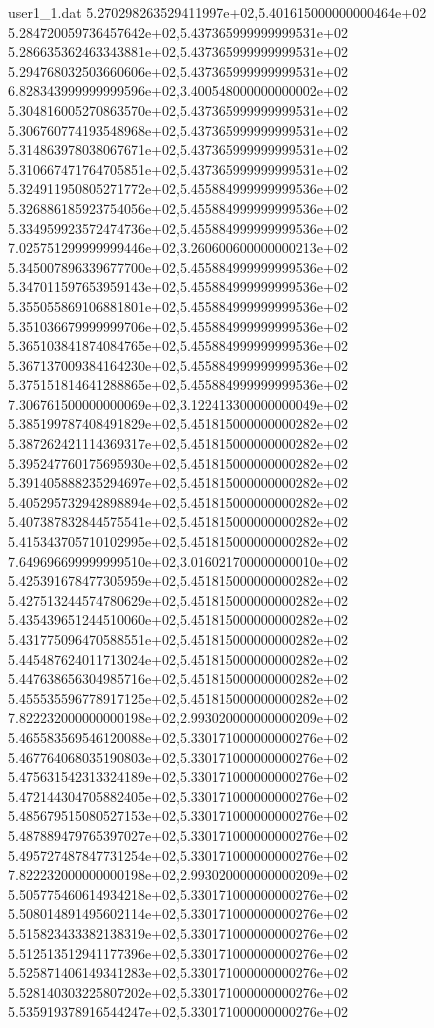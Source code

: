 \begin{filecontents}{user1_1.dat}
5.270298263529411997e+02,5.401615000000000464e+02
5.284720059736457642e+02,5.437365999999999531e+02
5.286635362463343881e+02,5.437365999999999531e+02
5.294768032503660606e+02,5.437365999999999531e+02
6.828343999999999596e+02,3.400548000000000002e+02
5.304816005270863570e+02,5.437365999999999531e+02
5.306760774193548968e+02,5.437365999999999531e+02
5.314863978038067671e+02,5.437365999999999531e+02
5.310667471764705851e+02,5.437365999999999531e+02
5.324911950805271772e+02,5.455884999999999536e+02
5.326886185923754056e+02,5.455884999999999536e+02
5.334959923572474736e+02,5.455884999999999536e+02
7.025751299999999446e+02,3.260600600000000213e+02
5.345007896339677700e+02,5.455884999999999536e+02
5.347011597653959143e+02,5.455884999999999536e+02
5.355055869106881801e+02,5.455884999999999536e+02
5.351036679999999706e+02,5.455884999999999536e+02
5.365103841874084765e+02,5.455884999999999536e+02
5.367137009384164230e+02,5.455884999999999536e+02
5.375151814641288865e+02,5.455884999999999536e+02
7.306761500000000069e+02,3.122413300000000049e+02
5.385199787408491829e+02,5.451815000000000282e+02
5.387262421114369317e+02,5.451815000000000282e+02
5.395247760175695930e+02,5.451815000000000282e+02
5.391405888235294697e+02,5.451815000000000282e+02
5.405295732942898894e+02,5.451815000000000282e+02
5.407387832844575541e+02,5.451815000000000282e+02
5.415343705710102995e+02,5.451815000000000282e+02
7.649696699999999510e+02,3.016021700000000010e+02
5.425391678477305959e+02,5.451815000000000282e+02
5.427513244574780629e+02,5.451815000000000282e+02
5.435439651244510060e+02,5.451815000000000282e+02
5.431775096470588551e+02,5.451815000000000282e+02
5.445487624011713024e+02,5.451815000000000282e+02
5.447638656304985716e+02,5.451815000000000282e+02
5.455535596778917125e+02,5.451815000000000282e+02
7.822232000000000198e+02,2.993020000000000209e+02
5.465583569546120088e+02,5.330171000000000276e+02
5.467764068035190803e+02,5.330171000000000276e+02
5.475631542313324189e+02,5.330171000000000276e+02
5.472144304705882405e+02,5.330171000000000276e+02
5.485679515080527153e+02,5.330171000000000276e+02
5.487889479765397027e+02,5.330171000000000276e+02
5.495727487847731254e+02,5.330171000000000276e+02
7.822232000000000198e+02,2.993020000000000209e+02
5.505775460614934218e+02,5.330171000000000276e+02
5.508014891495602114e+02,5.330171000000000276e+02
5.515823433382138319e+02,5.330171000000000276e+02
5.512513512941177396e+02,5.330171000000000276e+02
5.525871406149341283e+02,5.330171000000000276e+02
5.528140303225807202e+02,5.330171000000000276e+02
5.535919378916544247e+02,5.330171000000000276e+02

\end{filecontents}
